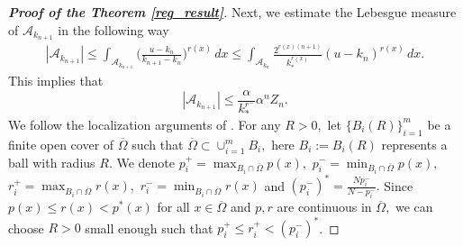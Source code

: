 \documentclass[11pt]{article}
\newcommand{\A}{\mathcal{A}_{k_{n+1}}}
\newcommand{\al} {\alpha}
\newcommand{\om} {\Omega}
\newcommand{\oline} {\overline}
\begin{document}
\begin{proof}[\bf Proof of the Theorem \ref{reg_result}]
Next, we estimate the Lebesgue measure of $\A$
in the following way
\begin{align*}
    |\A|\le  
\int_{\A} \Big ( 
\frac{u-k_n}{k_{n+1}-k_n}\Big )^{r(x)} \, dx\le 
\int_{\mathcal{A}_{k_n}}
\frac{2^{r(x)(n+1)}}{k_*^{r(x)}} (u-k_n)^{r(x)}\, dx.
\end{align*}
This implies that 
\begin{equation}\label{eqr4}
    |\A|\le  
\frac{\al}{k_*^{r^-}}\al^nZ_n.
\end{equation}
We follow the localization arguments of
\cite[Theorem 4.2, page no.\ 159]{KuHo2}.
For any $R>0,$
let $\{B_i(R)\}_{i=1}^m$
be a finite open cover of $\oline\om$
such that $\oline\om\subset\cup_{i=1}^mB_i,$
here $B_i:=B_i(R)$
represents a ball with radius $R.$
We denote $p_i^+=\max_{B_i\cap\oline\om }p(x),$
$p_i^-=\min_{B_i\cap\oline\om }p(x),$
$r_i^+=\max_{B_i\cap\oline\om }r(x),$
$r_i^-=\min_{B_i\cap\oline\om }r(x)$
and $(p_i^-)^*=
\frac{Np_i^-}{N-p_i^-}.$
Since $p(x)\le r(x)<p^*(x)$
for all $x\in\oline\om$
and $p,r$
are continuous in $\oline\om,$
we can choose $R>0$
small enough such that $p_i^+\le r_i^+<(p_i^-)^*$.


\end{proof}
\end{document}

